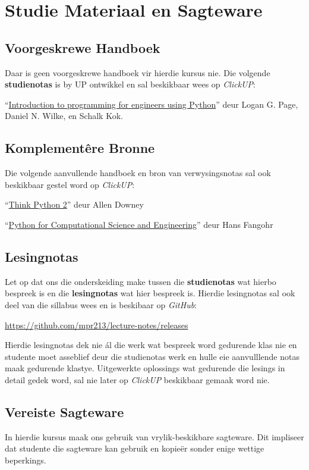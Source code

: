 \section{Studie Materiaal en Sagteware}
    \subsection{Voorgeskrewe Handboek}
        Daar is geen voorgeskrewe handboek vir hierdie kursus nie. Die volgende
        \textbf{studienotas} is by UP ontwikkel en sal beskikbaar wees op
        \textit{ClickUP}:

        ``\underline{Introduction to programming for engineers using Python}''
        deur Logan G. Page, Daniel N. Wilke, en Schalk Kok.

    \subsection{Komplement\^{e}re Bronne}
        Die volgende aanvullende handboek en bron van verwysingsnotas sal ook
        beskikbaar gestel word op \textit{ClickUP}:

        ``\underline{Think Python 2}'' deur Allen Downey

        ``\underline{Python for Computational Science and Engineering}'' deur
        Hans Fangohr

    \subsection{Lesingnotas}
        Let op dat ons die onderskeiding make tussen die \textbf{studienotas}
        wat hierbo bespreek is en die \textbf{lesingnotas} wat hier bespreek
        is. Hierdie lesingnotas sal ook deel van die sillabus wees en is
        beskibaar op \textit{GitHub}:

        \url{https://github.com/mpr213/lecture-notes/releases}

        Hierdie lesingnotas dek nie \'{a}l die werk wat bespreek word gedurende
        klas nie en studente moet asseblief deur die studienotas werk en hulle
        eie aanvulllende notas maak gedurende klastye. Uitgewerkte oplossings
        wat gedurende die lesings in detail gedek word, sal nie later op
        \textit{ClickUP} beskikbaar gemaak word nie.

    \subsection{Vereiste Sagteware}
        In hierdie kursus maak ons gebruik van vrylik-beskikbare sagteware.
        Dit impliseer dat studente die sagteware kan gebruik en kopie\"er
        sonder enige wettige beperkings.

